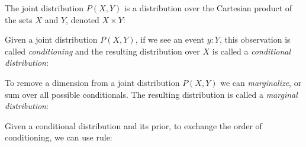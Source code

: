 \documentclass{article}
\begin{document}
%

The joint distribution $P(X, Y)$ is a distribution over the Cartesian product of the sets $X$ and $Y$, denoted $X \times Y$:

\begin{prooftree}
\end{prooftree}

Given a joint distribution $P(X, Y)$, if we see an event $y: Y$, this observation is called \textit{conditioning} and the resulting distribution over $X$ is called a \textit{conditional distribution}:


\begin{prooftree}
\end{prooftree}

To remove a dimension from a joint distribution $P(X, Y)$ we can \textit{marginalize}, or sum over all possible conditionals. The resulting distribution is called a \textit{marginal distribution}:

\begin{prooftree}
\end{prooftree}

Given a conditional distribution and its prior, to exchange the order of conditioning, we can use \citet{bayes1763essay} rule:

\begin{prooftree}
\end{prooftree}
\end{document}
